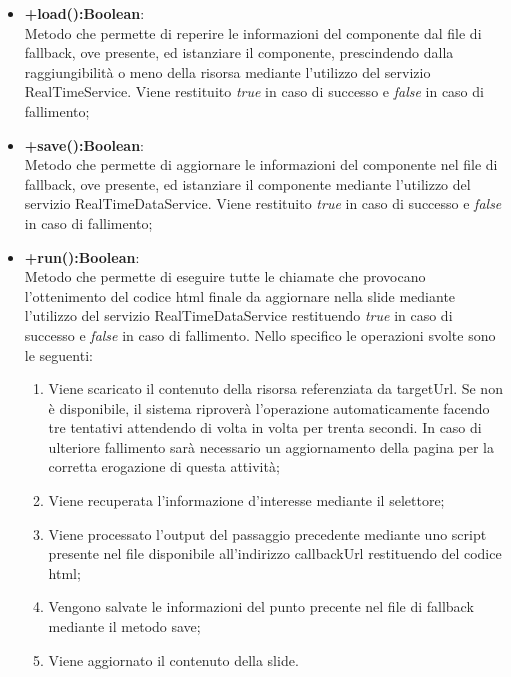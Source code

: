 \begin{itemize}
	\item \textbf{+load():Boolean}:\\	
		Metodo che permette di reperire le informazioni del componente dal file di fallback, ove presente, ed istanziare il componente, prescindendo dalla raggiungibilità o meno della risorsa mediante l'utilizzo del servizio RealTimeService. Viene restituito \textit{true} in caso di successo e \textit{false} in caso di fallimento;
		
	\item \textbf{+save():Boolean}:\\	
		Metodo che permette di aggiornare le informazioni del componente nel file di fallback, ove presente, ed istanziare il componente mediante l'utilizzo del servizio RealTimeDataService. Viene restituito \textit{true} in caso di successo e \textit{false} in caso di fallimento;
		
	\item \textbf{+run():Boolean}:\\
		Metodo che permette di eseguire tutte le chiamate che provocano l'ottenimento del codice html finale da aggiornare nella slide mediante l'utilizzo del servizio RealTimeDataService restituendo \textit{true} in caso di successo e \textit{false} in caso di fallimento.
		Nello specifico le operazioni svolte sono le seguenti:
		\begin{enumerate}
			\item Viene scaricato il contenuto della risorsa referenziata da targetUrl. Se non è disponibile, il sistema riproverà l'operazione automaticamente facendo tre tentativi attendendo di volta in volta per trenta secondi. In caso di ulteriore fallimento sarà necessario un aggiornamento della pagina per la corretta erogazione di questa attività;
			\item Viene recuperata l'informazione d'interesse mediante il selettore;
			\item Viene processato l'output del passaggio precedente mediante uno script presente nel file disponibile all'indirizzo callbackUrl restituendo del codice html;
			\item Vengono salvate le informazioni del punto precente nel file di fallback mediante il metodo save;
			\item Viene aggiornato il contenuto della slide.
		\end{enumerate}
	
	\end{itemize}
